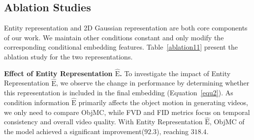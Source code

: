 \documentclass[runningheads]{llncs}
\newcommand{\ours}{\textup{DragAnything}\xspace}
\begin{document}
\subsection{Ablation Studies}

Entity representation and 2D Gaussian representation are both core components of our work.
%
We maintain other conditions constant and only modify the corresponding conditional embedding features.
%
Table~\ref{ablation11} present the ablation study for the two representations.

\textbf{Effect of Entity Representation $\bm{\mathrm{\hat{E}}}$.} 
%
To investigate the impact of Entity Representation $\bm{\mathrm{\hat{E}}}$, we observe the change in performance by determining whether this representation is included in the final embedding (Equation~\ref{equ2}).
%
As condition information $\bm{\mathrm{\hat{E}}}$ primarily affects the object motion in generating videos, we only need to compare ObjMC, while FVD and FID metrics focus on temporal consistency and overall video quality.
%
With Entity Representation $\bm{\mathrm{\hat{E}}}$, ObjMC of the model achieved a significant improvement($92.3$), reaching $318.4$.


\begin{table}[t]
    \centering
    \small 
    \setlength{\tabcolsep}{1mm}
    \begin{minipage}[t]{0.56\linewidth}
    \caption{\textbf{Ablation for Entity and 2D Gaussian Representation.} The combination of the both yields the greatest benefit.
    }
    
    \label{ablation11}
    \end{minipage}
    \hfill
   \begin{minipage}[t]{0.42\textwidth}
   \caption{\textbf{Ablation Study for Loss Mask $\bm{\mathrm{M}}$.} Loss mask can bring certain gains, especially for the ObjMC metric.
    }
    \vspace{+2mm}
    
    \label{ablation12}
    \end{minipage}
    
\end{table}

%     
    
\end{document}
